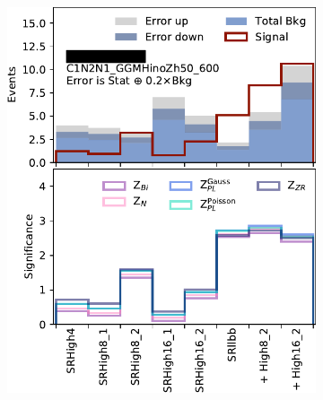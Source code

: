 \begin{figure}[tp]
\centering
\begin{subfigure}{0.495\textwidth}
\centering
\includegraphics[width=\textwidth]{figures/2ljets_disco_llbb_C1N2N1_GGMHinoZh50_600.png}
\caption{}
\end{subfigure}
\hfill
\begin{subfigure}{0.495\textwidth}
\centering

\end{subfigure}
\end{figure}
